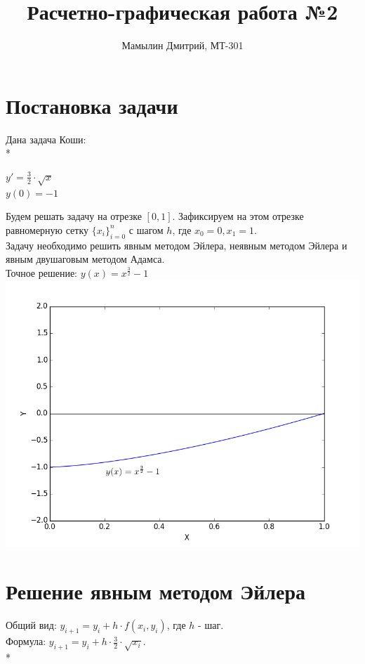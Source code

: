 \documentclass[12pt,a4paper]{article}
\title{Расчетно-графическая работа №2}
\author{Мамылин Дмитрий, МТ-301}
\begin{document}

\maketitle
\thispagestyle{empty}

\newpage
\thispagestyle{empty}

    \section*{Постановка задачи}
        Дана задача Коши:\\*
        \begin{center}
            $y' = \frac{3}{2}\cdot\sqrt{x}$\\
            $y(0) = -1$
        \end{center}\smallskip
        Будем решать задачу на отрезке $[0, 1]$. Зафиксируем на этом отрезке
        равномерную сетку $\{x_{i}\}_{i=0}^{n}$ с шагом $h$, где $x_{0} = 0, x_{1} = 1$.\\
        Задачу необходимо решить явным методом Эйлера, неявным методом Эйлера и
        явным двушаговым методом Адамса.\\
        Точное решение: $y(x) = x^{\frac{3}{2}} - 1$\\
        \includegraphics[scale=0.5]{exactSolutionGraph}
        
    \section*{Решение явным методом Эйлера}
    	Общий вид: $y_{i+1} = y_{i} + h \cdot f(x_{i}, y_{i})$, где $h$ - шаг.\\
        Формула: $y_{i+1} = y_{i} + h \cdot \frac{3}{2}\cdot\sqrt{x_{i}}$.\\*
\end{document}
